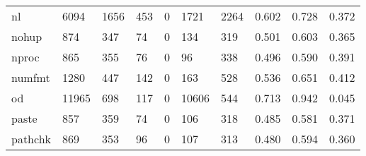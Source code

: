 \begin{longtable}{lp{2.0cm}p{2.0cm}p{2.0cm}p{2.0cm}p{2.0cm}p{2.0cm}p{2.0cm}p{2.0cm}p{2.0cm}}
nl        &                   6094 &                               1656 &                               453 &                                0 &                              1721 &                            2264 &                                   0.602 &                                  0.728 &                                0.372 \\
nohup     &                    874 &                                347 &                                74 &                                0 &                               134 &                             319 &                                   0.501 &                                  0.603 &                                0.365 \\
nproc     &                    865 &                                355 &                                76 &                                0 &                                96 &                             338 &                                   0.496 &                                  0.590 &                                0.391 \\
numfmt    &                   1280 &                                447 &                               142 &                                0 &                               163 &                             528 &                                   0.536 &                                  0.651 &                                0.412 \\
od        &                  11965 &                                698 &                               117 &                                0 &                             10606 &                             544 &                                   0.713 &                                  0.942 &                                0.045 \\
paste     &                    857 &                                359 &                                74 &                                0 &                               106 &                             318 &                                   0.485 &                                  0.581 &                                0.371 \\
pathchk   &                    869 &                                353 &                                96 &                                0 &                               107 &                             313 &                                   0.480 &                                  0.594 &                                0.360 \\

\end{longtable}
